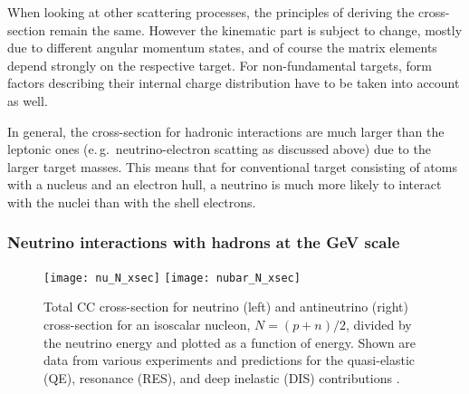 
When looking at other scattering processes, the principles of deriving the
cross-section remain the same. However the kinematic part is subject to change,
mostly due to different angular momentum states, and of course the matrix
elements depend strongly on the respective target. For non-fundamental targets,
form factors describing their internal charge distribution have to be taken
into account as well.

In general, the cross-section for hadronic interactions are much larger than the
leptonic ones (e.\,g.\ neutrino-electron scatting as discussed above) due to the
larger target masses. This means that for conventional target consisting of
atoms with a nucleus and an electron hull, a neutrino is much more likely to
interact with the nuclei than with the shell electrons.

\subsubsection{Neutrino interactions with hadrons at the GeV scale}

\begin{figure}
\centering
  \subfloat
    {\texttt{[image: nu\_N\_xsec]}}\qquad
  \subfloat
    {\texttt{[image: nubar\_N\_xsec]}}
  \caption{Total CC cross-section for neutrino (left) and antineutrino
   (right) cross-section for an isoscalar nucleon, $N=(p+n)/2$, divided by the
   neutrino energy and plotted as a function of energy. Shown are data from
   various experiments and predictions for the quasi-elastic (QE), resonance
   (RES), and deep inelastic (DIS) contributions \cite{NuXsec_review}.}
\label{fig:NuXsec_GeV}
\end{figure}

